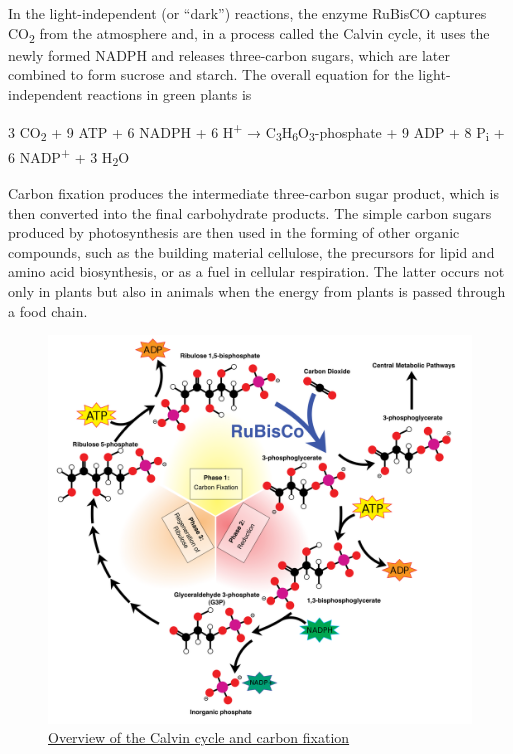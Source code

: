 In the light-independent (or ``dark'') reactions, the enzyme RuBisCO captures CO\textsubscript{2} from the atmosphere and, in a process called the Calvin cycle, it uses the newly formed NADPH and releases three-carbon sugars, which are later combined to form sucrose and starch. The overall equation for the light-independent reactions in green plants is

3 CO\textsubscript{2} + 9 ATP + 6 NADPH + 6 H\textsuperscript{+} → C\textsubscript{3}H\textsubscript{6}O\textsubscript{3}-phosphate + 9 ADP + 8 P\textsubscript{i} + 6 NADP\textsuperscript{+} + 3 H\textsubscript{2}O

Carbon fixation produces the intermediate three-carbon sugar product, which is then converted into the final carbohydrate products. The simple carbon sugars produced by photosynthesis are then used in the forming of other organic compounds, such as the building material cellulose, the precursors for lipid and amino acid biosynthesis, or as a fuel in cellular respiration. The latter occurs not only in plants but also in animals when the energy from plants is passed through a food chain.



\begin{figure}

{\centering \includegraphics[width=0.7\linewidth]{./figures/photosynthesis/Calvin-cycle4} 

}

\caption{\href{https://commons.wikimedia.org/wiki/File:Calvin-cycle4.svg}{Overview of the Calvin cycle and carbon fixation}}\label{fig:calvincycle}
\end{figure}

